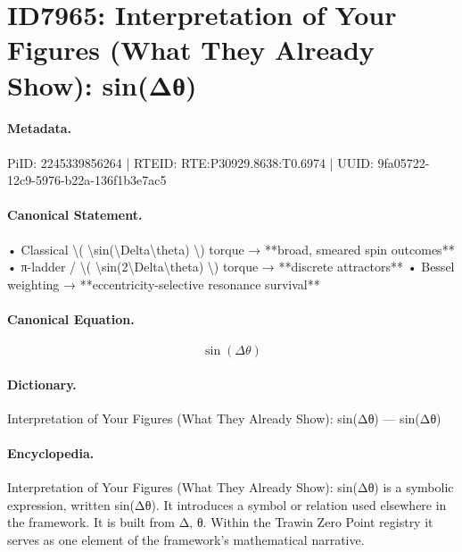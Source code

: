 \section*{ID7965: Interpretation of Your Figures (What They Already Show): sin(Δθ)}
\paragraph{Metadata.}
PiID: 2245339856264 | RTEID: RTE:P30929.8638:T0.6974 | UUID: 9fa05722-12c9-5976-b22a-136f1b3e7ac5

\paragraph{Canonical Statement.}
• Classical \textbackslash{}( \textbackslash{}sin(\textbackslash{}Delta\textbackslash{}theta) \textbackslash{}) torque → **broad, smeared spin outcomes** • π-ladder / \textbackslash{}( \textbackslash{}sin(2\textbackslash{}Delta\textbackslash{}theta) \textbackslash{}) torque → **discrete attractors** • Bessel weighting → **eccentricity-selective resonance survival**

\paragraph{Canonical Equation.}
\[
\sin(\Delta\theta)
\]

\paragraph{Dictionary.}
Interpretation of Your Figures (What They Already Show): sin(Δθ) — sin(Δθ)

\paragraph{Encyclopedia.}
Interpretation of Your Figures (What They Already Show): sin(Δθ) is a symbolic expression, written sin(Δθ). It introduces a symbol or relation used elsewhere in the framework. It is built from Δ, θ. Within the Trawin Zero Point registry it serves as one element of the framework's mathematical narrative.
